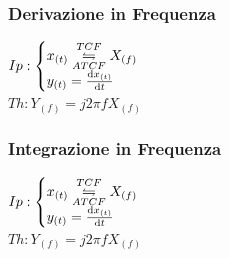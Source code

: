         \subsubsection{Derivazione in Frequenza}\label{Derivazione in Frequenza}
            $Ip:\begin{cases}
                x_{(t)}\overunderset{TCF}{ATCF}{\leftrightharpoons} X_{(f)}\\
                y_{(t)}= \derivative{x_{(t)}}{t}
            \end{cases}$\\
            $Th: Y_{(f)} = j2\pi f X_{(f)} $ \\
            
                
        \subsubsection{Integrazione in Frequenza}\label{Integrazione in Frequenza}
            $Ip:\begin{cases}
                x_{(t)}\overunderset{TCF}{ATCF}{\leftrightharpoons} X_{(f)} \\
                y_{(t)}= \derivative{x_{(t)}}{t}
            \end{cases}$\\
            $Th: Y_{(f)} = j2\pi f X_{(f)} $ \\
            

                        
